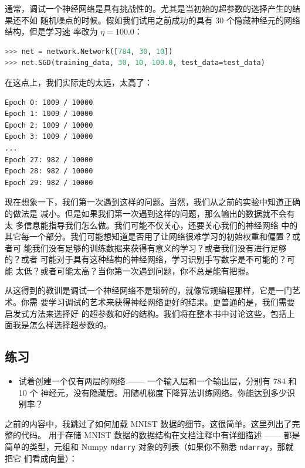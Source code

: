 通常，调试一个神经网络是具有挑战性的。尤其是当初始的超参数的选择产生的结果还不如
随机噪点的时候。假如我们试用之前成功的具有 30 个隐藏神经元的网络结构，但是学习速
率改为 $\eta = 100.0$：

\begin{lstlisting}[language=Python]
>>> net = network.Network([784, 30, 10])
>>> net.SGD(training_data, 30, 10, 100.0, test_data=test_data)
\end{lstlisting}

在这点上，我们实际走的太远，\learningrate{}太高了：

\begin{lstlisting}[language=sh]
Epoch 0: 1009 / 10000
Epoch 1: 1009 / 10000
Epoch 2: 1009 / 10000
Epoch 3: 1009 / 10000
...
Epoch 27: 982 / 10000
Epoch 28: 982 / 10000
Epoch 29: 982 / 10000
\end{lstlisting}

现在想象一下，我们第一次遇到这样的问题。当然，我们从之前的实验中知道正确的做法是
减小\learningrate{}。但是如果我们第一次遇到这样的问题，那么输出的数据就不会有太
多信息能指导我们怎么做。我们可能不仅关心\learningrate{}，还要关心我们的神经网络
中的其它每一个部分。我们可能想知道是否用了让网络很难学习的初始权重和偏置？或者可
能我们没有足够的训练数据来获得有意义的学习？或者我们没有进行足够的\epoch{}？或者
可能对于具有这种结构的神经网络，学习识别手写数字是不可能的？可能\learningrate{}
太低？或者可能\learningrate{}太高？当你第一次遇到问题，你不总是能有把握。

从这得到的教训是调试一个神经网络不是琐碎的，就像常规编程那样，它是一门艺术。你需
要学习调试的艺术来获得神经网络更好的结果。更普通的是，我们需要启发式方法来选择好
的超参数和好的结构。我们将在整本书中讨论这些，包括上面我是怎么样选择超参数的。

\subsection*{练习}

\begin{itemize}
\item 试着创建一个仅有两层的网络 —— 一个输入层和一个输出层，分别有 784 和 10 个
  神经元，没有隐藏层。用随机梯度下降算法训练网络。你能达到多少识别率？
\end{itemize}

之前的内容中，我跳过了如何加载 MNIST 数据的细节。这很简单。这里列出了完整的代码。
用于存储 MNIST 数据的数据结构在文档注释中有详细描述 —— 都是简单的类型，元组和
Numpy \lstinline!ndarry! 对象的列表（如果你不熟悉 \lstinline!ndarray!，那就把它
  们看成向量）：

